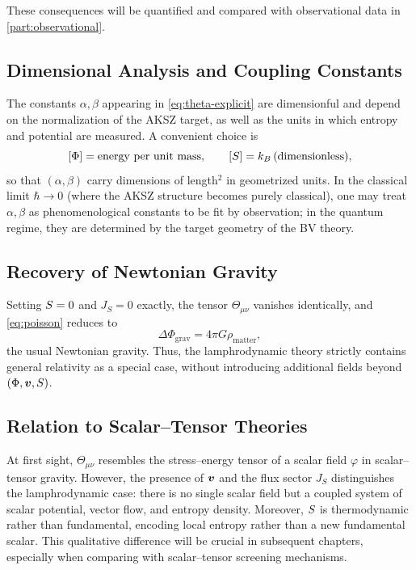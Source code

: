 These consequences will be quantified and compared with observational data in
\cref{part:observational}.

\subsection{Dimensional Analysis and Coupling Constants}

The constants $\alpha,\beta$ appearing in \eqref{eq:theta-explicit} are
dimensionful and depend on the normalization of the AKSZ target, as well as
the units in which entropy and potential are measured. A convenient choice is
\[
  [\Phi] = \text{energy per unit mass},\qquad
  [S] = k_B\,(\text{dimensionless}),
\]
so that $(\alpha,\beta)$ carry dimensions of length$^2$ in geometrized units.
In the classical limit $\hbar\to0$ (where the AKSZ structure becomes purely
classical), one may treat $\alpha,\beta$ as phenomenological constants to be
fit by observation; in the quantum regime, they are determined by the target
geometry of the BV theory.

\subsection{Recovery of Newtonian Gravity}

Setting $S=0$ and $J_S=0$ exactly, the tensor $\Theta_{\mu\nu}$ vanishes
identically, and \eqref{eq:poisson} reduces to
\[
  \Delta \Phi_{\mathrm{grav}} = 4\pi G \rho_{\mathrm{matter}},
\]
the usual Newtonian gravity. Thus, the lamphrodynamic theory strictly contains
general relativity as a special case, without introducing additional fields
beyond $(\Phi,\bm{v},S)$.

\subsection{Relation to Scalar--Tensor Theories}

At first sight, $\Theta_{\mu\nu}$ resembles the stress--energy tensor of a
scalar field $\varphi$ in scalar--tensor gravity. However, the presence of
$\bm{v}$ and the flux sector $J_S$ distinguishes the lamphrodynamic case:
there is no single scalar field but a coupled system of scalar potential,
vector flow, and entropy density. Moreover, $S$ is thermodynamic rather
than fundamental, encoding local entropy rather than a new fundamental
scalar. This qualitative difference will be crucial in subsequent chapters,
especially when comparing with scalar--tensor screening mechanisms.

